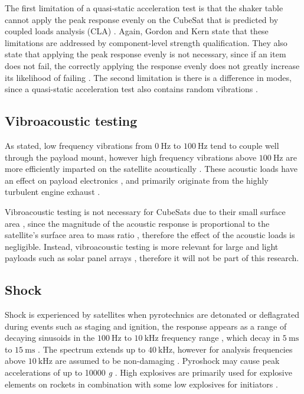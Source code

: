 \documentclass[a4paper,11pt]{article}
\begin{document}
The first limitation of a quasi-static acceleration test is that the shaker table cannot apply the peak response evenly on the CubeSat that is predicted by coupled loads analysis (CLA) \cite{gordon2015benefits}. Again, Gordon and Kern state that these limitations are addressed by component-level strength qualification. They also state that applying the peak response evenly is not necessary, since if an item does not fail, the correctly applying the response evenly does not greatly increase its likelihood of failing \cite{gordon2015benefits}.
The second limitation is there is a difference in modes, since a quasi-static acceleration test also contains random vibrations \cite{gordon2015benefits}.



\subsection{Vibroacoustic testing}

As stated, low frequency vibrations from $\SI{0}{\hertz}$ to $\SI{100}{\hertz}$ tend to couple well through the payload mount, however high frequency vibrations above $\SI{100}{\hertz}$ are more efficiently imparted on the satellite acoustically \cite{gordon2015benefits}. These acoustic loads have an effect on payload electronics \cite{casalino2012rocket}, and primarily originate from the highly turbulent engine exhaust \cite{casalino2012rocket}.

Vibroacoustic testing is not necessary for CubeSats due to their small surface area \cite{nasa-gevs}, since the magnitude of the acoustic response is proportional to the satellite's surface area to mass ratio \cite{brown_elements_2002}, therefore the effect of the acoustic loads is negligible. Instead, vibroacoustic testing is more relevant for large and light payloads such as solar panel arrays \cite{brown_elements_2002}, therefore it will not be part of this research.

\subsection{Shock}

Shock is experienced by satellites when pyrotechnics are detonated or deflagrated during events such as staging and ignition, the response appears as a range of decaying sinusoids in the $\SI{100}{\hertz}$ to $\SI{10}{\kilo\hertz}$ frequency range \cite{brown_elements_2002}, which decay in $\SI{5}{\milli\second}$ to $\SI{15}{\milli\second}$ \cite{brown_elements_2002}. The spectrum extends up to $\SI{40}{\kilo\hertz}$, however for analysis frequencies above $\SI{10}{\kilo\hertz}$ are assumed to be non-damaging \cite{bement1995manual,nasa-pyroshock}. Pyroshock may cause peak accelerations of up to 10000 \textit{g} \cite{nasa-pyroshock}. High explosives are primarily used for explosive elements on rockets in combination with some low explosives for initiators \cite{bement1995manual}.
\end{document}
